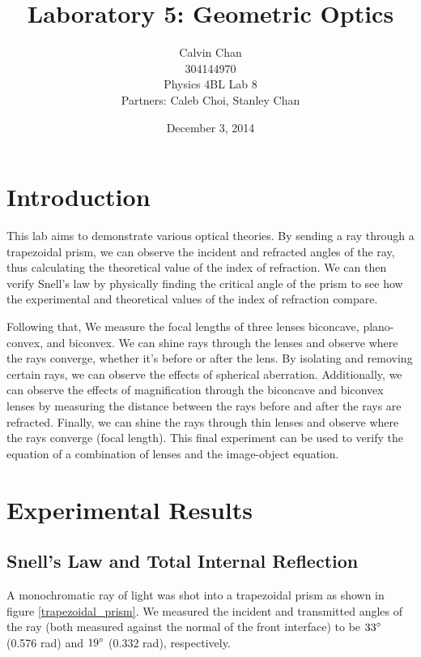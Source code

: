 \documentclass{article}
\begin{document}
\title{Laboratory 5: Geometric Optics}
\date{December 3, 2014}
\author{Calvin Chan\\304144970\\Physics 4BL Lab 8\\Partners: Caleb Choi, Stanley
Chan}

\maketitle

\section{Introduction}

This lab aims to demonstrate various optical theories. By sending a ray through
a trapezoidal prism, we can observe the incident and refracted angles of the
ray, thus calculating the theoretical value of the index of refraction. We can
then verify Snell's law by physically finding the critical angle of the prism to
see how the experimental and theoretical values of the index of refraction
compare.

Following that, We measure the focal lengths of three lenses biconcave,
plano-convex, and biconvex. We can shine rays through the lenses and observe
where the rays converge, whether it's before or after the lens. By isolating and
removing certain rays, we can observe the effects of spherical aberration.
Additionally, we can observe the effects of magnification through the biconcave
and biconvex lenses by measuring the distance between the rays before and after
the rays are refracted. Finally, we can shine the rays through thin lenses and
observe where the rays converge (focal length). This final experiment can be
used to verify the equation of a combination of lenses and the image-object
equation.

\section{Experimental Results}

\subsection{Snell's Law and Total Internal Reflection}

A monochromatic ray of light was shot into a trapezoidal prism as shown in
figure \ref{trapezoidal_prism}. We measured the incident and transmitted angles
of the ray (both measured against the normal of the front interface)
to be $33\degree$ (0.576 rad) and $19\degree$ (0.332 rad), respectively.
\end{document}
